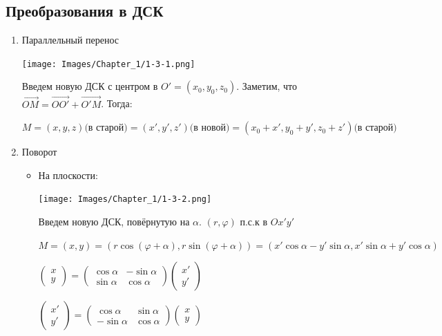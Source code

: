 \subsection{Преобразования в ДСК}
\begin{enumerate}[label=\alph*)]
    \item Параллельный перенос
          \begin{center}
              \texttt{[image: Images/Chapter\_1/1-3-1.png]}
          \end{center}
          Введем новую ДСК с центром в \(O' = (x_0, y_0, z_0)\). Заметим, что \(\overrightarrow{OM} = \overrightarrow{OO'} +  \overrightarrow{O'M}\). Тогда:

          \(M = (x, y, z) \text{(в старой)} = (x', y', z') \text{(в новой)} = (x_0 + x', y_0 + y', z_0 + z') \text{(в старой)}\)
    \item Поворот
          \begin{itemize}
              \item На плоскости:
                    \begin{center}
                        \texttt{[image: Images/Chapter\_1/1-3-2.png]}
                    \end{center}
                    Введем новую ДСК, повёрнутую на \(\alpha\). $(r,\varphi)$ п.с.к  в $Ox'y'$

                    \(M = (x, y) = (r \cos(\varphi + \alpha), r \sin(\varphi + \alpha)) =
                    (x' \cos\alpha - y' \sin\alpha, x' \sin\alpha + y' \cos\alpha)\)

                    \(\begin{pmatrix}
                        x \\
                        y
                    \end{pmatrix} =
                    \begin{pmatrix}
                        \cos\alpha & -\sin\alpha \\
                        \sin\alpha & \cos\alpha
                    \end{pmatrix}
                    \begin{pmatrix}
                        x' \\
                        y'
                    \end{pmatrix}\)

                    \(\begin{pmatrix}
                        x' \\
                        y'
                    \end{pmatrix} =
                    \begin{pmatrix}
                        \cos\alpha  & \sin\alpha \\
                        -\sin\alpha & \cos\alpha
                    \end{pmatrix}
                    \begin{pmatrix}
                        x \\
                        y
                    \end{pmatrix}\)


\end{itemize}
\end{enumerate}
